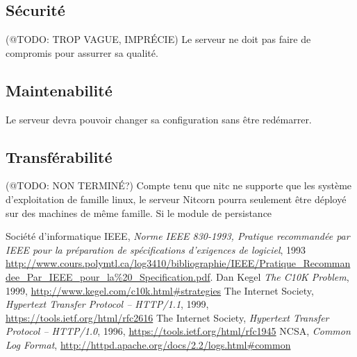 \documentclass{scrreprt}
\begin{document}
\subsection{Sécurité}
(@TODO: TROP VAGUE, IMPRÉCIE)
Le serveur ne doit pas faire de compromis pour assurrer sa qualité.
\subsection{Maintenabilité}
Le serveur devra pouvoir changer sa configuration sans être redémarrer.
\subsection{Transférabilité} 
(@TODO: NON TERMINÉ?)
Compte tenu que nitc ne supporte que les système d'exploitation de famille linux, le serveur Nitcorn pourra seulement être déployé
sur des machines de même famille. Si le module de persistance 

\begin{thebibliography}{9}
  Société d'informatique IEEE,
\emph{Norme IEEE 830-1993, Pratique recommandée par IEEE pour la préparation de
spécifications d’exigences de logiciel}, 1993
\url{http://www.cours.polymtl.ca/log3410/bibliographie/IEEE/Pratique_Recommandee_Par_IEEE_pour_la\%20_Specification.pdf}.
  Dan Kegel
\emph{The C10K Problem}, 1999, \url{http://www.kegel.com/c10k.html#strategies}
    The Internet Society,
\emph{Hypertext Transfer Protocol -- HTTP/1.1}, 1999,
\url{https://tools.ietf.org/html/rfc2616}
    The Internet Society,
\emph{Hypertext Transfer Protocol -- HTTP/1.0}, 1996,
\url{https://tools.ietf.org/html/rfc1945}
	NCSA,
\emph{Common Log Format},
\url{http://httpd.apache.org/docs/2.2/logs.html#common}	
\end{thebibliography}

\end{document}
